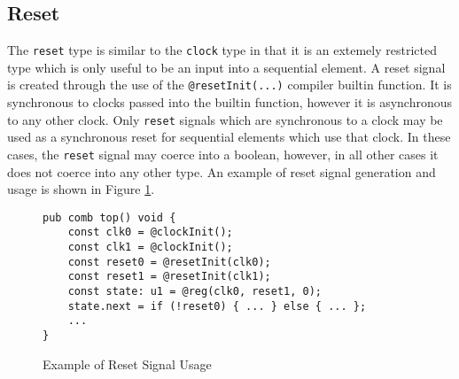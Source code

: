 \documentclass[10pt]{article}
\begin{document}
\subsection{Reset}
The \verb|reset| type is similar to the \verb|clock| type in that it is an extemely restricted type
which is only useful to be an input into a sequential element. A reset signal is created through the
use of the \verb|@resetInit(...)| compiler builtin function. It is synchronous to clocks passed into
the builtin function, however it is asynchronous to any other clock. Only \verb|reset| signals which
are synchronous to a clock may be used as a synchronous reset for sequential elements which use that
clock. In these cases, the \verb|reset| signal may coerce into a boolean, however, in all other
cases it does not coerce into any other type. An example of reset signal generation and usage is
shown in Figure \ref{fig:reset_example}.
\begin{figure}[H]
	\begin{verbatim}
pub comb top() void {
    const clk0 = @clockInit();
    const clk1 = @clockInit();
    const reset0 = @resetInit(clk0);
    const reset1 = @resetInit(clk1);
    const state: u1 = @reg(clk0, reset1, 0);
    state.next = if (!reset0) { ... } else { ... };
    ...
}
    \end{verbatim}
	\vspace*{-10mm}
	\caption{Example of Reset Signal Usage}
	\label{fig:reset_example}
\end{figure}
\end{document}
